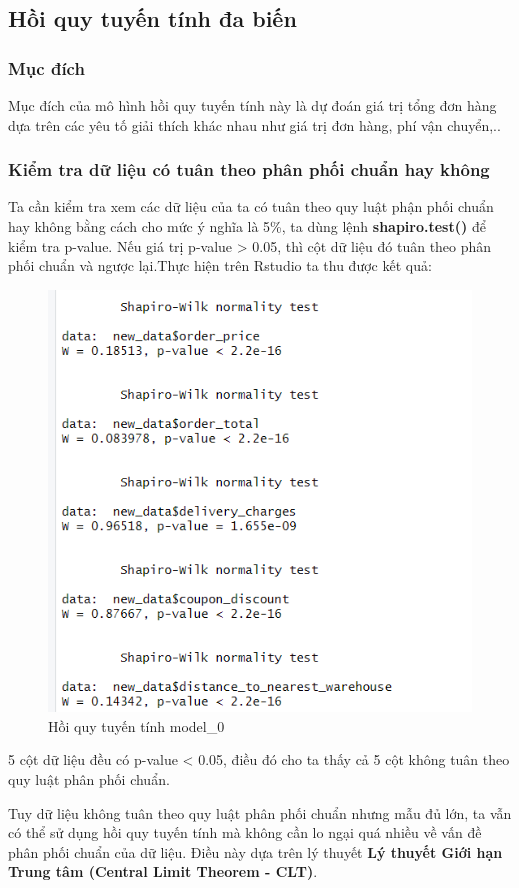 \subsection{Hồi quy tuyến tính đa biến}
\subsubsection{Mục đích}

Mục đích của mô hình hồi quy tuyến tính này là dự đoán giá trị tổng đơn hàng dựa trên các yêu tố giải thích khác nhau như giá trị đơn hàng, phí vận chuyển,..

\subsubsection{Kiểm tra dữ liệu có tuân theo phân phối chuẩn hay không} 

Ta cần kiểm tra xem các dữ liệu của ta có tuân theo quy luật phận phối chuẩn hay không bằng cách cho mức ý nghĩa là 5\%, ta dùng lệnh \textbf{shapiro.test()} để kiểm tra p-value. Nếu giá trị p-value > 0.05, thì cột dữ liệu đó tuân theo phân phối chuẩn và ngược lại.Thực hiện trên Rstudio ta thu được kết quả:
\newpage

\begin{figure}[ht]
  \centering
  \includegraphics[width=0.7\linewidth]{graphics/5.5.0.png}
  \caption{Hồi quy tuyến tính model\_0 }
\end{figure}

5 cột dữ liệu đều có p-value < 0.05, điều đó cho ta thấy cả 5 cột không tuân theo quy luật phân phối chuẩn.

Tuy dữ liệu không tuân theo quy luật phân phối chuẩn nhưng mẫu đủ lớn, ta vẫn có thể sử dụng hồi quy tuyến tính mà không cần lo ngại quá nhiều về vấn đề phân phối chuẩn của dữ liệu. Điều này dựa trên lý thuyết \textbf{Lý thuyết Giới hạn Trung tâm (Central Limit Theorem - CLT)}. 

